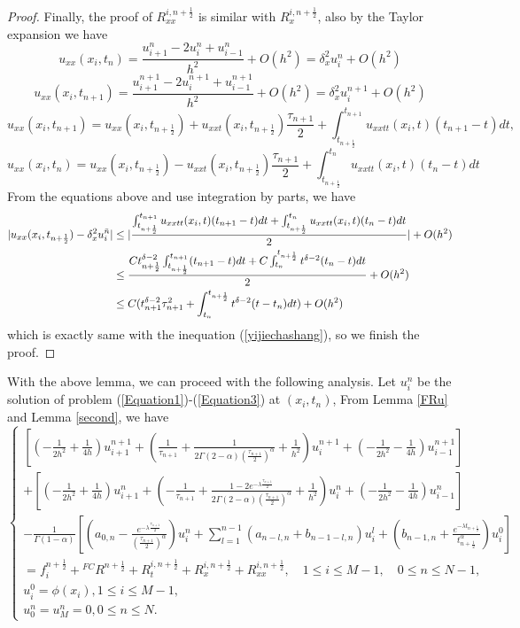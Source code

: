 \documentclass[10pt, reqno]{amsart}
\theoremstyle{remark}
\theoremstyle{definition}
\numberwithin{table}{section}
\begin{document}
\begin{proof}
Finally,  the proof of $R_{xx}^{i, n+\frac{1}{2}}$ is similar with $R_x^{i, n+\frac{1}{2}}$, also by the Taylor expansion we have
$$
u_{xx}(x_i, t_n)=\frac{u_{i+1}^n-2u_i^n+u_{i-1}^n}{h^2}+O(h^2)=\delta_x^2u_i^n+O(h^2)
$$
$$
u_{xx}(x_i, t_{n+1})=\frac{u_{i+1}^{n+1}-2u_i^{n+1}+u_{i-1}^{n+1}}{h^2}+O(h^2)=\delta_x^2u_i^{n+1}+O(h^2)
$$
$$
u_{xx}(x_i, t_{n+1})=u_{xx}(x_i, t_{n+\frac{1}{2}})+u_{xxt}(x_i, t_{n+\frac{1}{2}})\frac{\tau_{n+1}}{2}+\int_{t_{n+\frac{1}{2}}}^{t_{n+1}}u_{xxtt}(x_i, t)(t_{n+1}-t)dt, 
$$
$$
u_{xx}(x_i, t_{n})=u_{xx}(x_i, t_{n+\frac{1}{2}})-u_{xxt}(x_i, t_{n+\frac{1}{2}})\frac{\tau_{n+1}}{2}+\int_{t_{n+\frac{1}{2}}}^{t_{n}}u_{xxtt}(x_i, t)(t_{n}-t)dt
$$
From the equations above and use integration by parts, we have
\begin{align}
    |u_{xx}(x_i, t_{n+\frac{1}{2}})-\delta_x^2u_i^{\bar{n}}|&\leq |\frac{\int_{t_{n+\frac{1}{2}}}^{t_{n+1}}u_{xxtt}(x_i, t)(t_{n+1}-t)dt+\int_{t_{n+\frac{1}{2}}}^{t_{n}}u_{xxtt}(x_i, t)(t_{n}-t)dt}{2}|+O(h^2)\notag\\
    &\leq \frac{Ct_{n+\frac{1}{2}}^{\delta-2}\int_{t_{n+\frac{1}{2}}}^{t_{n+1}}(t_{n+1}-t)dt+C\int^{t_{n+\frac{1}{2}}}_{t_{n}}t^{\delta-2}(t_{n}-t)dt}{2}+O(h^2)\notag\\
    &\leq C(t_{n+1}^{\delta-2}\tau_{n+1}^2+\int^{t_{n+\frac{1}{2}}}_{t_{n}}t^{\delta-2}(t-t_{n})dt)+O(h^2)\notag
\end{align}
which is exactly same with the inequation (\ref{yijiechashang}), so we finish the proof. 
\end{proof}
With the above lemma,  we can proceed with the following analysis. Let $u_i^n$ be the solution of problem (\ref{Equation1})-(\ref{Equation3}) at $(x_i, t_n)$, From Lemma \ref{FRu} and Lemma \ref{second}, we have
\begin{equation}
\left\{\begin{array}{l}
{\left[\left(-\frac{1}{2 h^2}+\frac{1}{4h}\right) u_{i+1}^{n+1}+\left(\frac{1}{\tau_{n+1}}+\frac{1}{2\Gamma(2-\alpha)(\frac{\tau_{n+1}}{2})^\alpha}+\frac{1}{h^2}\right) u_i^{n+1}+\left(-\frac{1}{2 h^2}-\frac{1}{4h}\right) u_{i-1}^{n+1}\right]} \\
+\left[\left(-\frac{1}{2 h^2}+\frac{1}{4h}\right) u_{i+1}^{n}+\left(-\frac{1}{\tau_{n+1}}+\frac{1-2e^{-\lambda \frac{\tau_{n+1}}{2}}}{2\Gamma(2-\alpha)(\frac{\tau_{n+1}}{2})^\alpha}+\frac{1}{h^2}\right) u_i^{n}+\left(-\frac{1}{2 h^2}-\frac{1}{4h}\right) u_{i-1}^{n}\right] \\
-\frac{1}{\Gamma(1-\alpha)}\left[(a_{0, n}-\frac{e^{-\lambda \frac{\tau_{n+1}}{2}}}{(\frac{\tau_{n+1}}{2})^\alpha}) u_i^n+\sum\limits_{l=1}^{n-1} \left(a_{n-l, n}+b_{n-1-l, n}\right) u_i^l+(b_{n-1, n}+\frac{e^{-\lambda t_{n+\frac{1}{2}}}}{t_{n+\frac{1}{2}}^\alpha}) u_i^0\right] \\
=f_i^{n+\frac{1}{2}}+{}^{FC}R^{n+\frac{1}{2}}+R_t^{i, n+\frac{1}{2}}+R_x^{i, n+\frac{1}{2}}+R_{xx}^{i, n+\frac{1}{2}},  \quad 1 \leq i \leq M-1,  \quad 0 \leq n \leq N-1,  \\
u_i^0=\phi\left(x_i\right),  1 \leq i \leq M-1,  \\
u_0^n=u_M^n=0, 0 \leq n \leq N . 
\end{array}\right. 
\end{equation}
\end{document}
